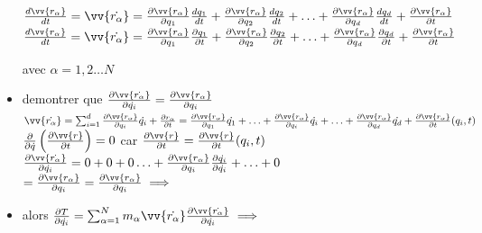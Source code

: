 \documentclass[12pt]{book}
\begin{document}
\begin{itemize}
                $\frac{d\vv{r_\alpha}}{dt} =\vv{\dot{r_\alpha}}= \frac{\partial\vv{r_\alpha}}{\partial q_1}\frac{dq_1}{dt}+\frac{\partial\vv{r_\alpha}}{\partial q_2}\frac{dq_2}{dt} + \ldots +\frac{\partial\vv{r_\alpha}}{\partial q_d}\frac{dq_d}{dt}+\frac{\partial\vv{r_\alpha}}{\partial t}$ \\
                $\frac{d\vv{r_\alpha}}{dt} =\vv{\dot{r_\alpha}}= \frac{\partial\vv{r_\alpha}}{\partial q_1}\frac{\partial q_1}{\partial t}+\frac{\partial\vv{r_\alpha}}{\partial q_2}\frac{\partial q_2}{\partial t} + \ldots +\frac{\partial\vv{r_\alpha}}{\partial q_d}\frac{\partial q_d}{\partial t}+\frac{\partial\vv{r_\alpha}}{\partial t}$ \\
                \begin{center}
                     avec $\alpha = 1,2\ldots N$
                \end{center}
                \item demontrer que $\frac{\partial\vv{\dot{r_\alpha}}}{\partial\dot{q_i}} = \frac{\partial\vv{r_\alpha}}{\partial q_i}$ \\ 
                $\vv{\dot{r_\alpha}} =\sum^d_{i =1} \frac{\partial\vv{r_\alpha}}{\partial q_i}\dot{q_i} + \frac{\partial r_\alpha}{\partial t} = \frac{\partial \vv{r_\alpha}}{\partial q_1}\dot{q_1} + \ldots+ \frac{\partial \vv{r_\alpha}}{\partial q_i}\dot{q_i} + \ldots + \frac{\partial \vv{r_\alpha}}{\partial q_d}\dot{q_d} +\frac{\partial \vv{r_\alpha}}{\partial t}(q_i,t)$ \\
                $\frac{\partial}{\partial \dot{q}}\left( \frac{\partial\vv{r}}{\partial t} \right) = 0$ car $\frac{\partial\vv{r}}{\partial t} = \frac{\partial \vv{r}}{\partial t}(q_i,t)$ \\
                $\frac{\partial \vv{\dot{r_\alpha}}}{\partial\dot{q_i}} = 0 +0 +0 \ldots + \frac{\partial \vv{r_\alpha }}{\partial q_i}\frac{\partial \dot{q_i}}{\partial \dot{q_i}} + \ldots + 0$ \\
                $=\frac{\partial\vv{r_\alpha}}{\partial q_i} = \frac{\partial\vv{r_\alpha}}{\partial q_i} \implies$ \\
                \item alors $\frac{\partial T}{\partial \dot{q_i}} =\sum^N_{\alpha =1}m_\alpha \vv{\dot{r_\alpha}}\frac{\partial \vv{\dot{r_\alpha}}}{\partial \dot{q_i}} \implies $ \\

\end{itemize}
\end{document}
